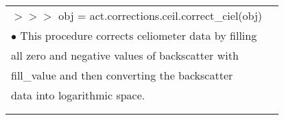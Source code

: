 \documentclass[potrait, z1paper, fontscale=0.33]{baposter} %
\begin{document}
\begin{poster}
{\begin{flushleft}
\begin{tabular}{@{}ll@{}}
$>$$>$$>$ obj = act.corrections.ceil.correct\_ciel(obj)\\
\-\hspace{0.2cm} $\bullet$ This procedure corrects celiometer data by filling\\
\-\hspace{0.5cm} all zero and negative values of backscatter with\\
\-\hspace{0.5cm} fill\_value and then converting the backscatter\\
\-\hspace{0.5cm} data into logarithmic space.\\
\\
\\
\end{tabular}
\end{flushleft}

}



\end{poster}
\end{document}
